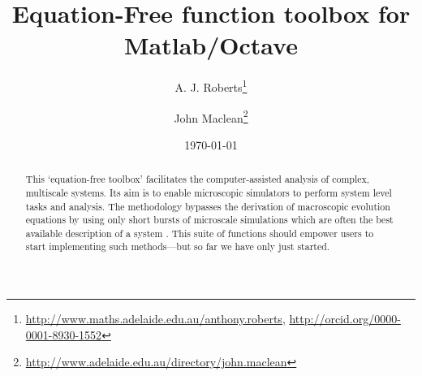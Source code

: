 \documentclass[11pt,a5paper,twoside]{article}
\title{Equation-Free function toolbox for Matlab/Octave}
\author{A. J. Roberts\thanks{%
\url{http://www.maths.adelaide.edu.au/anthony.roberts},
\url{http://orcid.org/0000-0001-8930-1552}}
\and John Maclean\thanks{%
\url{http://www.adelaide.edu.au/directory/john.maclean}}}
\date{\today}
\makeatletter
\def\fancyvrbStartStop{%
  \edef\FancyVerbStartString{\@percentchar\@charrb} 
  \edef\FancyVerbStopString{\@percentchar\@charlb} }
\makeatother
\begin{document}

\maketitle

\begin{abstract}
This `equation-free toolbox' facilitates the computer-assisted analysis of complex, multiscale systems.
Its aim is to enable microscopic simulators to perform system level tasks and analysis.
The methodology bypasses the derivation of macroscopic evolution equations by using only short bursts of microscale simulations which are often the best available description of a system
\cite[e.g.]{Kevrekidis09a, Kevrekidis04a, Kevrekidis03b}.
This suite of functions should empower users to start implementing such methods---but so far we have only just started.
\end{abstract}

\tableofcontents



\fancyvrbStartStop



%



%

\appendix



\end{document}
